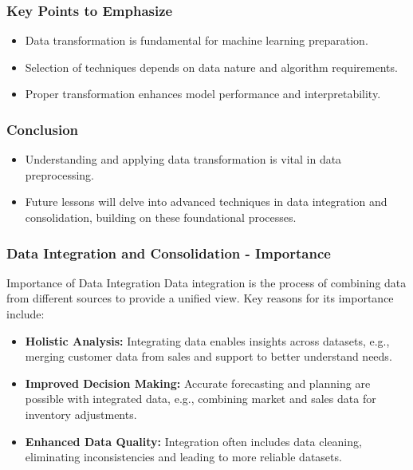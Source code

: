 \documentclass[aspectratio=169]{beamer}
\begin{document}
\begin{frame}[fragile]
    \frametitle{Key Points to Emphasize}
    \begin{itemize}
        \item Data transformation is fundamental for machine learning preparation.
        \item Selection of techniques depends on data nature and algorithm requirements.
        \item Proper transformation enhances model performance and interpretability.
    \end{itemize}
\end{frame}

\begin{frame}[fragile]
    \frametitle{Conclusion}
    \begin{itemize}
        \item Understanding and applying data transformation is vital in data preprocessing.
        \item Future lessons will delve into advanced techniques in data integration and consolidation, building on these foundational processes.
    \end{itemize}
\end{frame}

\begin{frame}[fragile]
    \frametitle{Data Integration and Consolidation - Importance}
    \begin{block}{Importance of Data Integration}
        Data integration is the process of combining data from different sources to provide a unified view. Key reasons for its importance include:
    \end{block}
    \begin{itemize}
        \item \textbf{Holistic Analysis:} Integrating data enables insights across datasets, e.g., merging customer data from sales and support to better understand needs.
        \item \textbf{Improved Decision Making:} Accurate forecasting and planning are possible with integrated data, e.g., combining market and sales data for inventory adjustments.
        \item \textbf{Enhanced Data Quality:} Integration often includes data cleaning, eliminating inconsistencies and leading to more reliable datasets.
    \end{itemize}
\end{frame}
\end{document}
